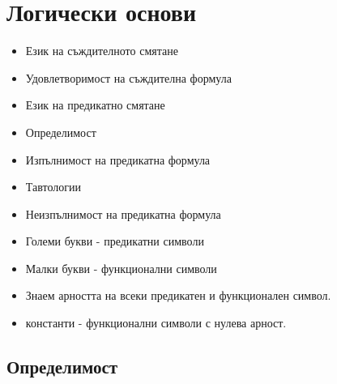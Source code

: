 \chapter{Логически основи}


\begin{itemize}
\item
  Език на съждителното смятане
\item
  Удовлетворимост на съждителна формула
\item
  Език на предикатно смятане
\item
  Определимост
\item
  Изпълнимост на предикатна формула
\item
  Тавтологии
\item
  Неизпълнимост на предикатна формула
\end{itemize}

\begin{itemize}
\item
  Големи букви - предикатни символи
\item
  Малки букви - функционални символи
\item
  Знаем арността на всеки предикатен и функционален символ.
\item
  константи - функционални символи с нулева арност.
\end{itemize}

\section{Определимост}

